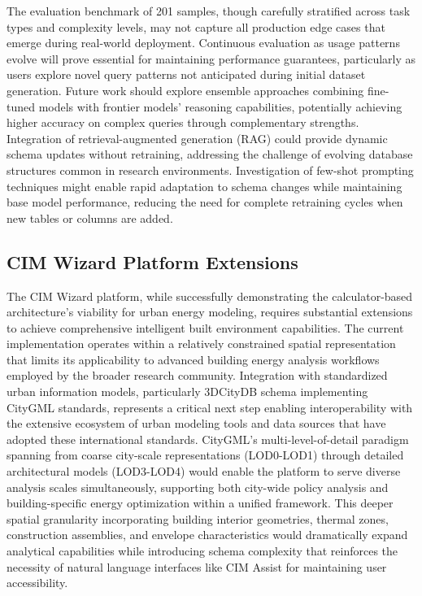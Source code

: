 The evaluation benchmark of 201 samples, though carefully stratified across task types and complexity levels, may not capture all production edge cases that emerge during real-world deployment. Continuous evaluation as usage patterns evolve will prove essential for maintaining performance guarantees, particularly as users explore novel query patterns not anticipated during initial dataset generation. Future work should explore ensemble approaches combining fine-tuned models with frontier models' reasoning capabilities, potentially achieving higher accuracy on complex queries through complementary strengths. Integration of retrieval-augmented generation (RAG) could provide dynamic schema updates without retraining, addressing the challenge of evolving database structures common in research environments. Investigation of few-shot prompting techniques might enable rapid adaptation to schema changes while maintaining base model performance, reducing the need for complete retraining cycles when new tables or columns are added.

\subsection{CIM Wizard Platform Extensions}

The CIM Wizard platform, while successfully demonstrating the calculator-based architecture's viability for urban energy modeling, requires substantial extensions to achieve comprehensive intelligent built environment capabilities. The current implementation operates within a relatively constrained spatial representation that limits its applicability to advanced building energy analysis workflows employed by the broader research community. Integration with standardized urban information models, particularly 3DCityDB schema implementing CityGML standards, represents a critical next step enabling interoperability with the extensive ecosystem of urban modeling tools and data sources that have adopted these international standards. CityGML's multi-level-of-detail paradigm spanning from coarse city-scale representations (LOD0-LOD1) through detailed architectural models (LOD3-LOD4) would enable the platform to serve diverse analysis scales simultaneously, supporting both city-wide policy analysis and building-specific energy optimization within a unified framework. This deeper spatial granularity incorporating building interior geometries, thermal zones, construction assemblies, and envelope characteristics would dramatically expand analytical capabilities while introducing schema complexity that reinforces the necessity of natural language interfaces like CIM Assist for maintaining user accessibility.

